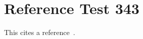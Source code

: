 \documentclass{article}
\begin{document}
\section{Reference Test 343}
This cites a reference~\cite{test343}.

\end{document}
